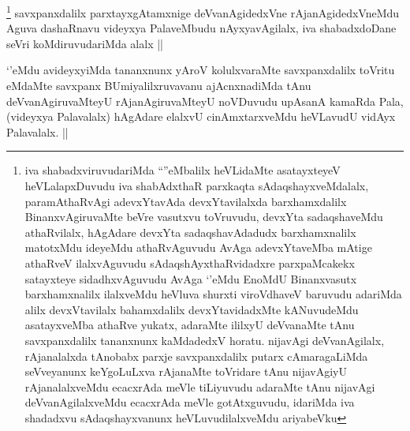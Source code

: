 
\begin{artha}
\footnote{iva shabadxviruvudariMda ``\stext''eMbalilx heVLidaMte asatayxteyeV heVLalapxDuvudu iva shabAdxthaR parxkaqta sAdaqshayxveMdalalx, paramAthaRvAgi adevxYtavAda devxYtavilalxda barxhamxdalilx BinanxvAgiruvaMte beVre vasutxvu toVruvudu, devxYta sadaqshaveMdu athaRvilalx, hAgAdare devxYta sadaqshavAdadudx barxhamxnalilx matotxMdu ideyeMdu athaRvAguvudu AvAga adevxYtaveMba mAtige athaRveV ilalxvAguvudu sAdaqshAyxthaRvidadxre parxpaMcakekx satayxteye sidadhxvAguvudu AvAga `\stext'eMdu EnoMdU Binanxvasutx barxhamxnalilx ilalxveMdu heVluva shurxti viroVdhaveV baruvudu adariMda alilx devxVtavilalx bahamxdalilx devxYtavidadxMte kANuvudeMdu asatayxveMba athaRve yukatx, adaraMte ililxyU deVvanaMte tAnu savxpanxdalilx tananxnunx kaMdadedxV horatu. nijavAgi deVvanAgilalx, rAjanalalxda tAnobabx parxje savxpanxdalilx putarx cAmaragaLiMda seVveyanunx keYgoLuLxva rAjanaMte toVridare tAnu nijavAgiyU rAjanalalxveMdu ecacxrAda meVle tiLiyuvudu adaraMte tAnu nijavAgi deVvanAgilalxveMdu ecacxrAda meVle gotAtxguvudu, idariMda iva shadadxvu sAdaqshayxvanunx heVLuvudilalxveMdu ariyabeVku}
savxpanxdalilx parxtayxgAtamxnige deVvanAgidedxVne rAjanAgidedxVneMdu Aguva dashaRnavu videyxya PalaveMbudu nAyxyavAgilalx, iva shabadxdoDane seVri koMdiruvudariMda alalx ||
\end{artha}


\begin{artha}
`\stext'eMdu avideyxyiMda tananxnunx yAroV kolulxvaraMte savxpanxdalilx toVritu eMdaMte savxpanx BUmiyalilxruvavanu ajAcnxnadiMda tAnu deVvanAgiruvaMteyU rAjanAgiruvaMteyU noVDuvudu upAsanA kamaRda Pala, (videyxya Palavalalx) hAgAdare elalxvU cinAmxtarxveMdu heVLavudU vidAyx Palavalalx. ||
\end{artha}


